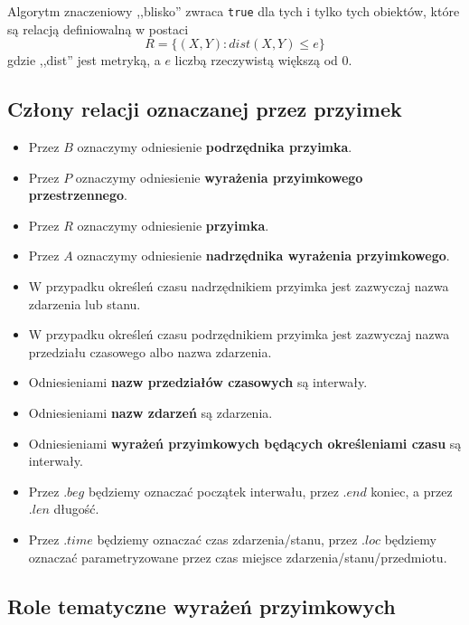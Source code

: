 \documentclass[a4paper, 12pt]{article}
\theoremstyle{remark}
\begin{document}
Algorytm znaczeniowy ,,blisko'' zwraca \texttt{true} dla tych i tylko tych obiektów, które są relacją definiowalną w postaci 
\begin{equation}\label{alg_dla_blisko}
R=\{(X,Y):dist(X,Y) \leq e\}
\end{equation}
 gdzie ,,dist'' jest metryką, a $e$ liczbą rzeczywistą większą od 0.


\subsection{Człony relacji oznaczanej przez przyimek} %
\label{sub:czlony_relacji_oznaczanej_przez_przyimek}

\begin{itemize}
\item Przez $B$ oznaczymy odniesienie \textbf{podrzędnika przyimka}.
\item Przez $P$ oznaczymy odniesienie \textbf{wyrażenia przyimkowego przestrzennego}.
\item Przez $R$ oznaczymy odniesienie \textbf{przyimka}.
\item Przez $A$ oznaczymy odniesienie \textbf{nadrzędnika wyrażenia przyimkowego}.
\item W przypadku określeń czasu nadrzędnikiem przyimka jest zazwyczaj nazwa zdarzenia lub stanu.
\item W przypadku określeń czasu podrzędnikiem przyimka jest zazwyczaj nazwa przedziału czasowego albo nazwa zdarzenia.
\item Odniesieniami \textbf{nazw przedziałów czasowych }są interwały. 
\item Odniesieniami \textbf{nazw zdarzeń }są zdarzenia.
\item Odniesieniami \textbf{wyrażeń przyimkowych będących określeniami czasu }są interwały.
\item Przez $.beg$ będziemy oznaczać początek interwału, przez $.end$ koniec, a przez $.len$ długość.
\item Przez $.time$ będziemy oznaczać czas zdarzenia/stanu, przez $.loc$ będziemy oznaczać parametryzowane przez czas miejsce zdarzenia/stanu/przedmiotu.
\end{itemize}


\subsection{Role tematyczne wyrażeń przyimkowych} %
\label{sub:role_tematyczne_przyimkw_semantycznych}
\end{document}
